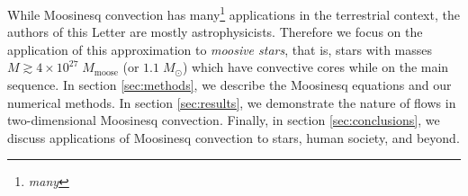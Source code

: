 While Moosinesq convection has many\footnote{\emph{many}} applications in the terrestrial context, the authors of this Letter are mostly astrophysicists.
Therefore we focus on the application of this approximation to \emph{moosive stars}, that is, stars with masses $M \gtrsim 4\times 10^{27} \; M_\mathrm{moose}$ (or $1.1 \; M_\odot$) which have convective cores while on the main sequence.
In section \ref{sec:methods}, we describe the Moosinesq equations and our numerical methods.
In section \ref{sec:results}, we demonstrate the nature of flows in two-dimensional Moosinesq convection.
Finally, in section \ref{sec:conclusions}, we discuss applications of Moosinesq convection to stars, human society, and beyond.
